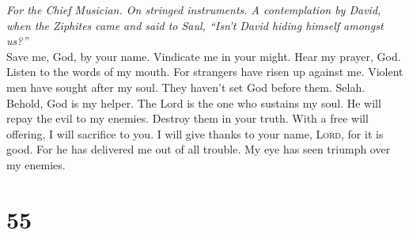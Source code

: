\emph{For the Chief Musician. On stringed instruments. A contemplation
by David, when the Ziphites came and said to Saul, ``Isn't David hiding
himself amongst us?''}\\
 Save me, God, by your name. Vindicate me in your might.
 Hear my prayer, God. Listen to the words of my mouth.
 For strangers have risen up against me. Violent men have
sought after my soul. They haven't set God before them. Selah.
 Behold, God is my helper. The Lord is the one who
sustains my soul.  He will repay the evil to my enemies.
Destroy them in your truth.  With a free will offering, I
will sacrifice to you. I will give thanks to your name, \textsc{Lord},
for it is good.  For he has delivered me out of all
trouble. My eye has seen triumph over my enemies.

\hypertarget{section-54}{%
\section{55}\label{section-54}}

